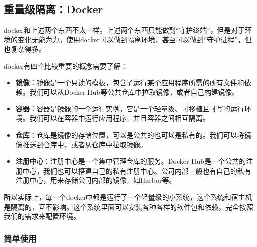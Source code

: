 \subsection{重量级隔离：Docker}\label{sec:docker}

docker和上述两个东西不太一样。上述两个东西只能做到“守护终端”，但是对于环境的变化无能为力。使用docker可以做到隔离环境，甚至可以做到“守护进程”，但也复杂得多。

docker有四个比较重要的概念需要了解：
\begin{itemize}
    \item \textbf{镜像}：镜像是一个只读的模板，包含了运行某个应用程序所需的所有文件和依赖。我们可以从Docker Hub等公共仓库中拉取镜像，或者自己构建镜像。
    \item \textbf{容器}：容器是镜像的一个运行实例，它是一个轻量级、可移植且可写的运行环境。我们可以在容器中运行应用程序，并且容器之间相互隔离。
    \item \textbf{仓库}：仓库是镜像的存储位置，可以是公共的也可以是私有的。我们可以将镜像推送到仓库中，或者从仓库中拉取镜像。
    \item \textbf{注册中心}：注册中心是一个集中管理仓库的服务。Docker Hub是一个公共的注册中心，我们也可以搭建自己的私有注册中心。公司内部一般也有自己的私有注册中心，用来存储公司内部的镜像，如Harbor等。
\end{itemize}
所以实际上，每一个docker中都是运行了一个轻量级的小系统，这个系统和宿主机是隔离的，互不影响。这个系统里面可以安装各种各样的软件包和依赖，完全按照我们的需求来配置环境。

\subsubsection{简单使用}

